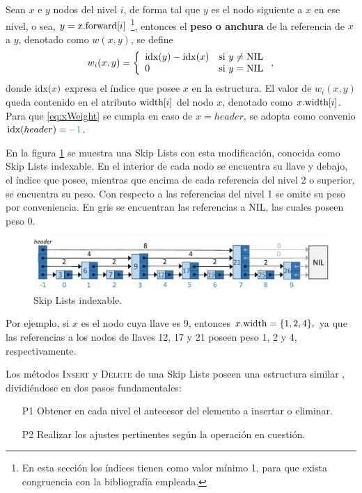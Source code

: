 \documentclass[a4paper,10pt,twocolumn]{article}
\newcommand{\idx}{{\rm idx}}
\newcommand{\fwd}[1]{{\rm forward}[#1]}
\newcommand{\fwdi}{\fwd{i}}
\newcommand{\withT}{{\rm width}}
\newcommand{\with}[1]{\withT[#1]}
\newcommand{\withi}{\with{i}}
\newcommand{\disliHeaderIdxColor}[1]{{\color{disliHeaderIdxColor}#1}}
\newcommand{\disliNodeKeyColor}[1]{{\color{disliNodeKeyColor}#1}}
\newcommand{\disliNodeIdxColor}[1]{{\color{disliNodeIdxColor}#1}}
\newcommand{\disliNilReferenceColor}[1]{{\color{disliNilReferenceColor}#1}}
\begin{document}
  Sean $ x $ e $ y $ nodos del nivel $ i $, de forma tal que $ y $ es el nodo siguiente a
  $ x $ en ese nivel, o sea, $ y = x . \fwdi $ \footnote{En esta sección los 
  índices tienen como valor mínimo 1, para que exista congruencia con la bibliografía 
  empleada.}, entonces el \textbf{peso o anchura} de la referencia de $ x $ a $ y $, denotado 
  como $ w(x, y) $, se define
  \begin{equation}\label{eq:xWeight}
  	w_i(x, y) = \left\{ \begin{array}{ll}
						  \idx(y) - \idx(x) & \text{si } y \neq \text{NIL}\\
						  0               & \text{si } y = \text{NIL}
					  \end{array} \right.,
  \end{equation}
  donde $ \idx(x) $ expresa el índice que posee $ x $ en la estructura. El valor de $ w_i(x, y) $ queda contenido en el atributo $ \withi $ del nodo $ x $, denotado como $ x . \withi $. Para que \ref{eq:xWeight} se cumpla en caso de $ x = header $, se adopta como convenio $ \idx(header) = \disliHeaderIdxColor{-1} $.
  
  En la figura \ref{fig:idxSkipL} se muestra una Skip Lists con esta modificación, conocida como Skip Lists indexable. En el interior de cada nodo se encuentra su \disliNodeKeyColor{llave} y debajo, el \disliNodeIdxColor{índice} que posee, mientras que encima de cada referencia del nivel 2 o superior, se encuentra su peso. Con respecto a las referencias del nivel 1 se omite su peso por conveniencia. En \disliNilReferenceColor{gris} se encuentran las referencias a NIL, las cuales poseen peso \disliNilReferenceColor{0}.
  
  \begin{figure}[htb]
  	\centering
  	\includegraphics[scale=.51]{Graphics/Indexable_Skip_Lists.pdf}
  	\caption{Skip Lists indexable.}\label{fig:idxSkipL}
  \end{figure}

  Por ejemplo, si $ x $ es el nodo cuya llave es 9, entonces 
  $ x . \withT = \{1, 2, 4\}, $ ya que las referencias a los nodos de llaves 12, 17 y 21 poseen peso 1, 2 y 4, respectivamente.
  
  Los métodos \textsc{Insert} y \textsc{Delete} de una Skip Lists poseen una estructura similar \cite{Pugh}, dividiéndose en dos pasos fundamentales:
  \begin{enumerate}
  	\item[P1] Obtener en cada nivel el antecesor del elemento a insertar o eliminar.
  	\item[P2] Realizar los ajustes pertinentes según la operación en cuestión.
  \end{enumerate}
\end{document}
